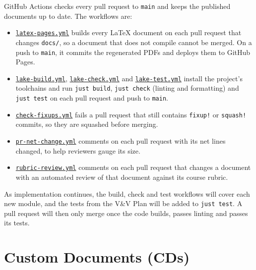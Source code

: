 \documentclass{article}
\begin{document}
GitHub Actions checks every pull request to \texttt{main} and keeps the
published documents up to date. The workflows are:
\begin{itemize}
  \item
    \href{https://github.com/capstoneCEGJM/Lake/blob/main/.github/workflows/latex-pages.yml}{\texttt{latex-pages.yml}}
    builds every LaTeX document on each pull request that changes
    \texttt{docs/}, so a document that does not compile cannot be merged. On a
    push to \texttt{main}, it commits the regenerated PDFs and deploys them to
    GitHub Pages.
  \item
    \href{https://github.com/capstoneCEGJM/Lake/blob/main/.github/workflows/lake-build.yml}{\texttt{lake-build.yml}},
    \href{https://github.com/capstoneCEGJM/Lake/blob/main/.github/workflows/lake-check.yml}{\texttt{lake-check.yml}}
    and
    \href{https://github.com/capstoneCEGJM/Lake/blob/main/.github/workflows/lake-test.yml}{\texttt{lake-test.yml}}
    install the project's toolchains and run \texttt{just build},
    \texttt{just check} (linting and formatting) and \texttt{just test} on each
    pull request and push to \texttt{main}.
  \item
    \href{https://github.com/capstoneCEGJM/Lake/blob/main/.github/workflows/check-fixups.yml}{\texttt{check-fixups.yml}}
    fails a pull request that still contains \texttt{fixup!} or
    \texttt{squash!} commits, so they are squashed before merging.
  \item
    \href{https://github.com/capstoneCEGJM/Lake/blob/main/.github/workflows/pr-net-change.yml}{\texttt{pr-net-change.yml}}
    comments on each pull request with its net lines changed, to help reviewers
    gauge its size.
  \item
    \href{https://github.com/capstoneCEGJM/Lake/blob/main/.github/workflows/rubric-review.yml}{\texttt{rubric-review.yml}}
    comments on each pull request that changes a document with an automated
    review of that document against its course rubric.
\end{itemize}

As implementation continues, the build, check and test workflows will cover
each new module, and the tests from the V\&V Plan will be added to
\texttt{just test}. A pull request will then only merge once the code builds,
passes linting and passes its tests.

\section{Custom Documents (CDs)}
\end{document}

